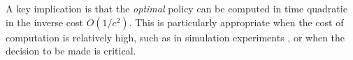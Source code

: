 A key implication is that the \emph{optimal} policy can be computed
in time quadratic in the inverse cost $O(1/c^2)$.  This is particularly appropriate when the cost of 
computation is relatively high, such as in simulation experiments \citep{Swisher+et+al:2003},
or when the decision to be made is critical.